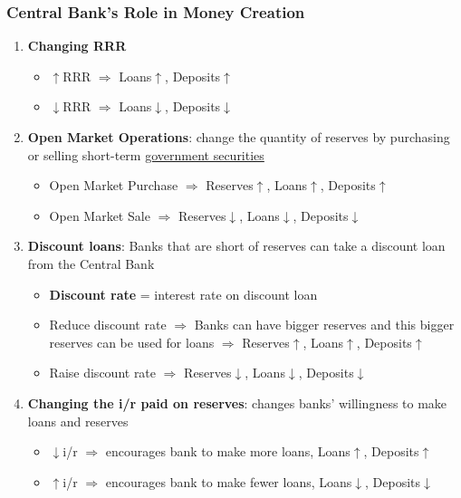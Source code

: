 \documentclass{article}
\begin{document}
\begin{multicols}{2}
\begin{itemize}
\end{itemize}
\subsubsection{Central Bank's Role in Money Creation}
\begin{enumerate}
	\item \textbf{Changing RRR}
	\begin{itemize}
		\item $\uparrow$RRR $\Rightarrow$ Loans$\uparrow$, Deposits$\uparrow$
		\item $\downarrow$RRR $\Rightarrow$ Loans$\downarrow$, Deposits$\downarrow$
	\end{itemize}
    \item \textbf{Open Market Operations}: change the quantity of reserves by purchasing or selling short-term \underline{government securities}
    \begin{itemize}
    	\item Open Market Purchase $\Rightarrow$ Reserves$\uparrow$, Loans$\uparrow$, Deposits$\uparrow$
    	\item Open Market Sale $\Rightarrow$ Reserves$\downarrow$, Loans$\downarrow$, Deposits$\downarrow$
    \end{itemize}
    \item \textbf{Discount loans}: Banks that are short of reserves can take a discount loan from the Central Bank
    \begin{itemize}
    	\item \textbf{Discount rate} = interest rate on discount loan
    	\item Reduce discount rate $\Rightarrow$ Banks can have bigger reserves and this bigger reserves can be used for loans $\Rightarrow$ Reserves$\uparrow$, Loans$\uparrow$, Deposits$\uparrow$
    	\item Raise discount rate $\Rightarrow$ Reserves$\downarrow$, Loans$\downarrow$, Deposits$\downarrow$
    \end{itemize}
    \item \textbf{Changing the i/r paid on reserves}: changes banks' willingness to make loans and reserves
    \begin{itemize}
    	\item $\downarrow$i/r $\Rightarrow$ encourages bank to make more loans, Loans$\uparrow$, Deposits$\uparrow$
    	\item $\uparrow$i/r $\Rightarrow$ encourages bank to make fewer loans, Loans$\downarrow$, Deposits$\downarrow$
    \end{itemize}
\end{enumerate}

\end{multicols}
\end{document}
